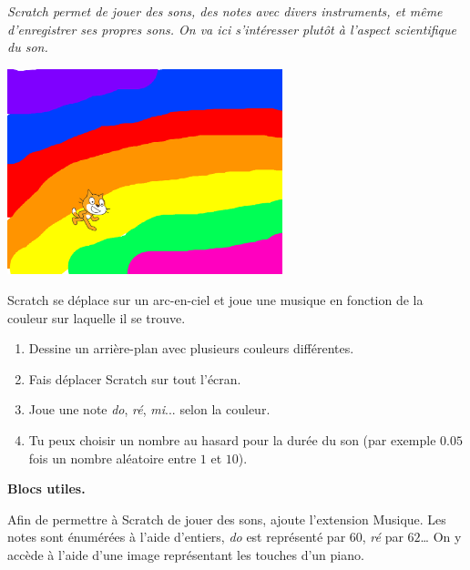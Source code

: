 \documentclass[class=report,crop=false, 12pt]{standalone}
\begin{document}




\bigskip
\bigskip

\emph{Scratch permet de jouer des sons, des notes avec divers instruments, et même d'enregistrer ses propres sons. On va ici s'intéresser plutôt à l'aspect scientifique du son.}

\bigskip
\bigskip



\begin{activite}

\sauteligne

\begin{center}
  \includegraphics[width=0.6\textwidth]{ecran-09-ex1} 
\end{center}

Scratch se déplace sur un arc-en-ciel et joue une musique en fonction de la couleur sur laquelle il se trouve.

\begin{enumerate}
  \item Dessine un arrière-plan avec plusieurs couleurs différentes.
  \item Fais déplacer Scratch sur tout l'écran.
  \item Joue une note \emph{do}, \emph{ré}, \emph{mi}... selon la couleur. 
  \item Tu peux choisir un nombre au hasard pour la durée du son  
  (par exemple $0.05$ fois un nombre aléatoire entre $1$ et $10$). 
\end{enumerate}

\medskip

\textbf{Blocs utiles.}

Afin de permettre à Scratch de jouer des sons, ajoute l'extension \og{}Musique\fg{}. 
Les notes sont énumérées à l'aide d'entiers, \emph{do} est représenté par $60$, 
\emph{ré} par $62$\ldots{} On y accède à l'aide d'une image représentant les touches d'un piano.



\end{activite}
\end{document}
